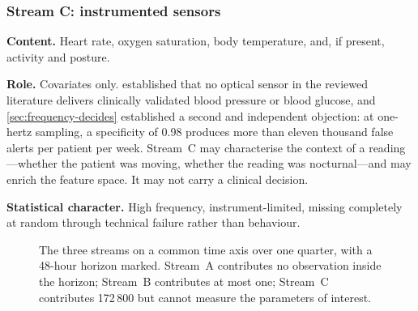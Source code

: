 \documentclass[12pt,a4paper,oneside]{report}
\begin{document}
\subsubsection{Stream C: instrumented sensors}

\textbf{Content.} Heart rate, oxygen saturation, body temperature, and, if present, activity and posture.

\textbf{Role.} Covariates only.  established that no optical sensor in the reviewed literature delivers clinically validated blood pressure or blood glucose, and \cref{sec:frequency-decides} established a second and independent objection: at one-hertz sampling, a specificity of 0.98 produces more than eleven thousand false alerts per patient per week. Stream~C may characterise the context of a reading---whether the patient was moving, whether the reading was nocturnal---and may enrich the feature space. It may not carry a clinical decision.

\textbf{Statistical character.} High frequency, instrument-limited, missing completely at random through technical failure rather than behaviour.

\begin{figure}[htbp]
\centering
{}
\caption{The three streams on a common time axis over one quarter, with a 48-hour horizon marked. Stream~A contributes no observation inside the horizon; Stream~B contributes at most one; Stream~C contributes 172\,800 but cannot measure the parameters of interest.}\label{fig:streams-timeline}
\end{figure}
\end{document}
